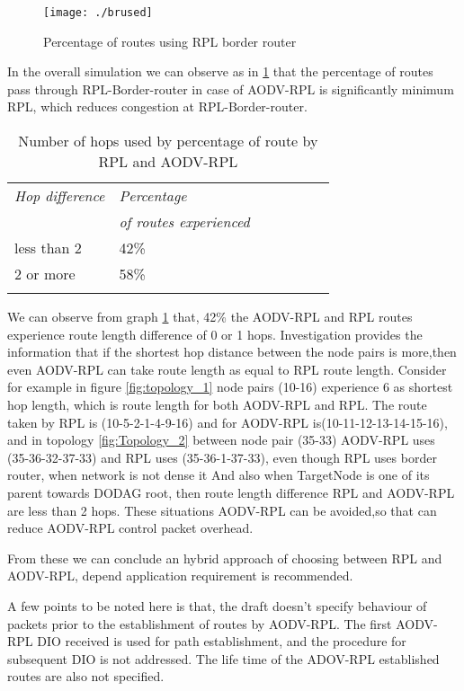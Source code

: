 \documentclass[conference, letterpaper]{IEEEtran}
\begin{document}
\begin{figure}[h!]
\texttt{[image: ./brused]}
\caption{Percentage of routes using RPL border router}
\label{fig:brused}
\end{figure}
In the overall simulation we can observe as in \ref{fig:brused} that the
percentage of routes pass through RPL-Border-router in case of AODV-RPL is
significantly minimum RPL, which reduces congestion at  RPL-Border-router.


\begin{table}[h!]
\centering
\begin{tabular}{lllllll}
\toprule
\emph{Hop difference } & \emph{Percentage }  \\
\emph{ } & \emph{of routes experienced} \\
\midrule less than 2 &  42\% & \\ 2 or more & 58\%  \\
\bottomrule \\
\end{tabular}
\caption{Number of hops used by percentage of route by RPL and AODV-RPL} \label{tab:hops-difd}
\end{table}


We can observe from  graph \ref{tab:hops-difd} that, 42\% the AODV-RPL and RPL routes  experience route length difference of  0 or 1 hops. Investigation provides the information that if the shortest hop distance between the node pairs is more,then even AODV-RPL can take route length as equal to RPL route length.
Consider for example in figure \ref{fig:topology_1} node pairs (10-16)
experience 6 as shortest hop length, which is route length for both AODV-RPL
and RPL. The route taken by RPL is (10-5-2-1-4-9-16) and for AODV-RPL is(10-11-12-13-14-15-16), and in topology \ref{fig:Topology_2} between node pair (35-33) AODV-RPL uses (35-36-32-37-33)  and RPL uses (35-36-1-37-33),  even though RPL uses border router, when network is not dense it
And also when TargetNode is one of its parent towards
DODAG root, then route length difference RPL and AODV-RPL are less than 2 hops.
These situations AODV-RPL can be avoided,so that can reduce AODV-RPL control
packet overhead.

From these we can conclude an hybrid approach of choosing between RPL and
AODV-RPL, depend application requirement  is recommended.

A few points to be noted here is that, the draft \cite{I-D.ietf-roll-aodv-rpl}
doesn't specify behaviour of packets prior to the establishment of routes by
AODV-RPL. The first AODV-RPL DIO received is used for path establishment, and
the procedure for subsequent DIO is not addressed. The life time of the
ADOV-RPL established routes are also not specified.
\end{document}

